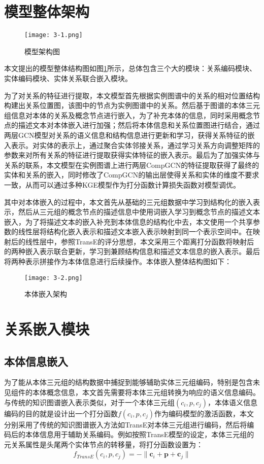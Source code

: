 \section{模型整体架构}
\begin{figure}[h]
  \centering
  \texttt{[image: 3-1.png]}
  \caption{模型架构图}
  \label{fig:3-1}
\end{figure}
本文提出的模型整体结构图如图\ref{fig:3-1}所示，总体包含三个大的模块：关系编码模块、实体编码模块、实体关系联合嵌入模块。

为了对关系的特征进行提取，本文模型首先根据实例图谱中的关系的相对位置结构构建出关系位置图，该图中的节点为实例图谱中的关系。然后基于图谱的本体三元组信息对本体的关系及概念节点进行嵌入，为了补充本体的信息，同时采用概念节点的描述文本对本体嵌入进行加强；然后将本体信息和关系位置图进行结合，通过两层GCN模型对关系的语义信息和结构信息进行更新和学习，获得关系特征的嵌入表示。对实体的表示上，通过聚合实体邻接关系，通过学习关系方向调整矩阵的参数来对所有关系的特征进行提取获得实体特征的嵌入表示。最后为了加强实体与关系的联系，本文模型在实例图谱上进行两层CompGCN的特征提取获得了最终的实体和关系的嵌入，同时修改了CompGCN的输出层使得关系和实体的维度不要求一致，从而可以通过多种KGE模型作为打分函数计算损失函数对模型调优。

其中对本体嵌入的过程中，本文首先从基础的三元组数据中学习到结构化的嵌入表示，然后从三元组的概念节点的描述信息中使用词嵌入学习到概念节点的描述文本嵌入，为了将描述文本的嵌入补充到本体信息的结构化中去，本文使用一个共享参数的线性层将结构化嵌入表示和描述文本嵌入表示映射到同一个表示空间中。在映射后的线性层中，参照TransE的评分思想，本文采用三个距离打分函数将映射后的两种嵌入表示联合更新，学习到兼顾结构信息和描述文本信息的嵌入表示。最后将两种表示拼接作为本体信息进行后续操作。本体嵌入整体结构图如下：
\begin{figure}[h]
  \centering
  \texttt{[image: 3-2.png]}
  \caption{本体嵌入架构}
  \label{fig:3-2}
\end{figure}

\section{关系嵌入模块}
\subsection{本体信息嵌入}
为了能从本体三元组的结构数据中捕捉到能够辅助实体三元组编码，特别是包含未见组件的本体概念信息，本文首先需要将本体三元组转换为响应的语义信息编码。与传统的知识图谱嵌入表示类似，对于一个本体三元组\((c_{i},p,c_{j})\)，本体语义信息编码的目的就是设计出一个打分函数\(f(c_{i},p,c_{j})\)作为编码模型的激活函数，本文分别采用了传统的知识图谱嵌入方法如TransE对本体三元组进行编码，然后将编码后的本体信息用于辅助关系编码。例如按照TransE模型的设定，本体三元组的元关系属性是头尾两个实体节点的转移量，将打分函数设置为：
\begin{equation}
  f_{TransE}(c_{i},p,c_{j}) = - \| \textbf{c}_{i} + \textbf{p} + \textbf{c}_{j}\| \label{eq:3-1}
\end{equation}

